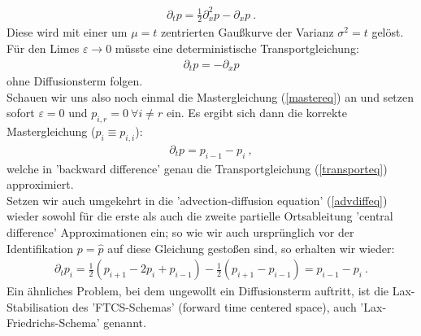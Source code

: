 \documentclass[a4paper, 12pt]{report}
\begin{document}
\begin{align}\label{advdiffeq}
\partial_t p = \frac{1}{2} \partial_x^2 p -\partial_x  p\ .
\end{align}
Diese wird mit einer um $\mu = t$ zentrierten Gaußkurve der Varianz $\sigma^2 = t$ gelöst.
\\
Für den Limes $\varepsilon \rightarrow 0$ müsste eine deterministische Transportgleichung:
\begin{align}\label{transporteq}
\partial_t p = -\partial_x p 
\end{align}
ohne Diffusionsterm folgen.
\\
Schauen wir uns also noch einmal die Mastergleichung (\ref{mastereq}) an und setzen sofort $\varepsilon=0$ und $p_{i,r}=0\ \forall i \neq r$ ein. Es ergibt sich dann die korrekte Mastergleichung ($p_i \equiv p_{i,i}$):
\begin{align}
\partial_t p = p_{i-1}-p_i\ ,
\end{align}
welche in 'backward difference' genau die Transportgleichung (\ref{transporteq}) approximiert.
\\
Setzen wir auch umgekehrt in die 'advection-diffusion equation' (\ref{advdiffeq}) wieder sowohl für die erste als auch die zweite partielle Ortsableitung 'central difference' Approximationen ein; so wie wir auch ursprünglich vor der Identifikation $p=\hat{p}$ auf diese Gleichung gestoßen sind, so erhalten wir wieder:
\begin{align}
\partial_t p_i = \frac{1}{2}(p_{i+1}-2p_{i}+p_{i-1}) - \frac{1}{2}(p_{i+1} - p_{i-1})=p_{i-1}-p_i\ .
\end{align}
Ein ähnliches Problem, bei dem ungewollt ein Diffusionsterm auftritt, ist die Lax-Stabilisation des 'FTCS-Schemas' (forward time centered space)\cite{Goetz}, auch 'Lax-Friedrichs-Schema' genannt. 
\end{document}

